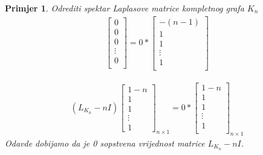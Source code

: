 \documentclass[11pt]{article}
\newtheorem{example}{Primjer}
\begin{document}
\begin{example}{Odrediti spektar Laplasove matrice kompletnog grafa $K_n$}
\[\begin{split}
\begin{bmatrix}
	0 \\
	0 \\
	0 \\
	\vdots \\
	0 \\
	\end{bmatrix}
	= 0 *
	\begin{bmatrix}
	-(n-1) \\
	1 \\
	1 \\
	\vdots \\
	1 \\
	\end{bmatrix}
	\end{split}
	\]
	
	\[
	\begin{split}
	(L_{K_n} - nI) 
	\begin{bmatrix}
	1-n \\
	1 \\
	1 \\
	\vdots \\
	1
	\end{bmatrix}_{n \times 1}
	= 0 *
	\begin{bmatrix}
	1-n \\
	1 \\
	1 \\
	\vdots \\
	1 \\
	\end{bmatrix}_{n \times 1} 
	\end{split}
	\]
	Odavde dobijamo da je 0 sopstvena vrijednost matrice $L_{K_n} - nI$. 
	\end{example}
	
\end{document}
